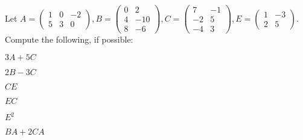     \clearpage
    \begin{problem}
    Let $A = \begin{pmatrix} 1 & 0 & -2 \\ 5 & 3 & 0 \end{pmatrix}, B = \begin{pmatrix} 0 & 2 \\ 4 & -10 \\ 8 & -6 \end{pmatrix}, C = \begin{pmatrix} 7 & -1 \\ -2 & 5 \\ -4 & 3 \end{pmatrix}, E = \begin{pmatrix} 1 & -3 \\ 2 & 5 \end{pmatrix}$. Compute the following, if possible:
    \begin{enumerate}
    \begin{multicols}{6}
        \item $3A+5C$
        \item $2B-3C$
        \item $CE$
        \item $EC$
        \item $E^2$
        \item $BA+2CA$
    \end{multicols}
    \end{enumerate}
    \end{problem}
